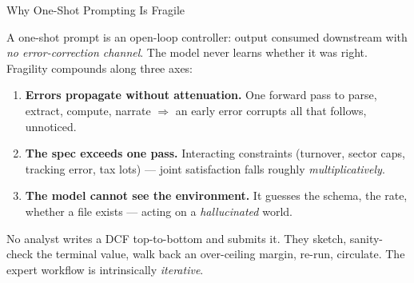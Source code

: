 \documentclass[9pt,t]{beamer}
\begin{document}
\begin{frame}{Why One-Shot Prompting Is Fragile}

A one-shot prompt is an \alert{open-loop controller}: output consumed downstream
with \emph{no error-correction channel}. The model never learns whether it was
right. Fragility compounds along three axes:

\medskip
\begin{enumerate}
  \item \textbf{Errors propagate without attenuation.} One forward pass to parse,
        extract, compute, narrate $\Rightarrow$ an early error corrupts all that
        follows, unnoticed.
  \item \textbf{The spec exceeds one pass.} Interacting constraints (turnover,
        sector caps, tracking error, tax lots) --- joint satisfaction falls
        roughly \emph{multiplicatively}.
  \item \textbf{The model cannot see the environment.} It guesses the schema, the
        rate, whether a file exists --- acting on a \emph{hallucinated} world.
\end{enumerate}

\medskip
\begin{bigpicture}
No analyst writes a DCF top-to-bottom and submits it. They sketch, sanity-check
the terminal value, walk back an over-ceiling margin, re-run, circulate. The
expert workflow is intrinsically \emph{iterative}.
\end{bigpicture}
\end{frame}
\end{document}

